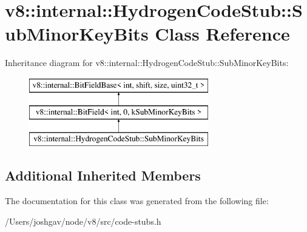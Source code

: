 \hypertarget{classv8_1_1internal_1_1_hydrogen_code_stub_1_1_sub_minor_key_bits}{}\section{v8\+:\+:internal\+:\+:Hydrogen\+Code\+Stub\+:\+:Sub\+Minor\+Key\+Bits Class Reference}
\label{classv8_1_1internal_1_1_hydrogen_code_stub_1_1_sub_minor_key_bits}
Inheritance diagram for v8\+:\+:internal\+:\+:Hydrogen\+Code\+Stub\+:\+:Sub\+Minor\+Key\+Bits\+:\begin{figure}[H]
\begin{center}
\leavevmode
\includegraphics[height=3.000000cm]{classv8_1_1internal_1_1_hydrogen_code_stub_1_1_sub_minor_key_bits}
\end{center}
\end{figure}
\subsection*{Additional Inherited Members}


The documentation for this class was generated from the following file\+:\begin{DoxyCompactItemize}
\item 
/\+Users/joshgav/node/v8/src/code-\/stubs.\+h\end{DoxyCompactItemize}
